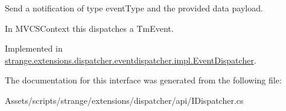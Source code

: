 Send a notification of type event\-Type and the provided data payload. 

In M\-V\-C\-S\-Context this dispatches a Tm\-Event. 

Implemented in \hyperlink{classstrange_1_1extensions_1_1dispatcher_1_1eventdispatcher_1_1impl_1_1_event_dispatcher_a14124806e6632e75aa0ff0c02d23483b}{strange.\-extensions.\-dispatcher.\-eventdispatcher.\-impl.\-Event\-Dispatcher}.



The documentation for this interface was generated from the following file\-:\begin{DoxyCompactItemize}
\item 
Assets/scripts/strange/extensions/dispatcher/api/I\-Dispatcher.\-cs\end{DoxyCompactItemize}
